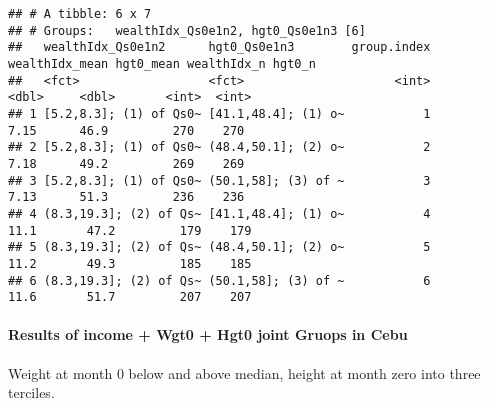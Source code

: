 \documentclass[
]{book}
\newenvironment{Shaded}{\begin{snugshade}}{\end{snugshade}}
\newcommand{\CommentTok}[1]{\textcolor[rgb]{0.56,0.35,0.01}{\textit{#1}}}
\newcommand{\DataTypeTok}[1]{\textcolor[rgb]{0.13,0.29,0.53}{#1}}
\newcommand{\DecValTok}[1]{\textcolor[rgb]{0.00,0.00,0.81}{#1}}
\newcommand{\FloatTok}[1]{\textcolor[rgb]{0.00,0.00,0.81}{#1}}
\newcommand{\KeywordTok}[1]{\textcolor[rgb]{0.13,0.29,0.53}{\textbf{#1}}}
\newcommand{\NormalTok}[1]{#1}
\newcommand{\OperatorTok}[1]{\textcolor[rgb]{0.81,0.36,0.00}{\textbf{#1}}}
\newcommand{\OtherTok}[1]{\textcolor[rgb]{0.56,0.35,0.01}{#1}}
\newcommand{\StringTok}[1]{\textcolor[rgb]{0.31,0.60,0.02}{#1}}
\begin{document}
\begin{verbatim}
## # A tibble: 6 x 7
## # Groups:   wealthIdx_Qs0e1n2, hgt0_Qs0e1n3 [6]
##   wealthIdx_Qs0e1n2      hgt0_Qs0e1n3        group.index wealthIdx_mean hgt0_mean wealthIdx_n hgt0_n
##   <fct>                  <fct>                     <int>          <dbl>     <dbl>       <int>  <int>
## 1 [5.2,8.3]; (1) of Qs0~ [41.1,48.4]; (1) o~           1           7.15      46.9         270    270
## 2 [5.2,8.3]; (1) of Qs0~ (48.4,50.1]; (2) o~           2           7.18      49.2         269    269
## 3 [5.2,8.3]; (1) of Qs0~ (50.1,58]; (3) of ~           3           7.13      51.3         236    236
## 4 (8.3,19.3]; (2) of Qs~ [41.1,48.4]; (1) o~           4          11.1       47.2         179    179
## 5 (8.3,19.3]; (2) of Qs~ (48.4,50.1]; (2) o~           5          11.2       49.3         185    185
## 6 (8.3,19.3]; (2) of Qs~ (50.1,58]; (3) of ~           6          11.6       51.7         207    207
\end{verbatim}

\hypertarget{results-of-income-wgt0-hgt0-joint-gruops-in-cebu}{%
\paragraph{Results of income + Wgt0 + Hgt0 joint Gruops in Cebu}\label{results-of-income-wgt0-hgt0-joint-gruops-in-cebu}}

Weight at month 0 below and above median, height at month zero into three terciles.

\begin{Shaded}
\end{Shaded}
\end{document}
